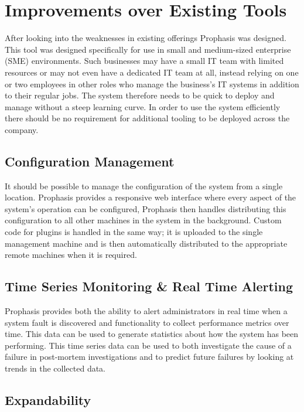 \documentclass[bsc,deptreport,twoside,parskip,singlespacing,notimes]{infthesis}
\begin{document}

\section{Improvements over Existing Tools}
	After looking into the weaknesses in existing offerings	Prophasis was designed.
	This tool was designed specifically for use in small and medium-sized enterprise
	(SME) environments. Such businesses may have a small IT team with limited
	resources or may not
	even have a dedicated IT team at all, instead relying on one or two employees
	in other roles who manage the business's IT systems in addition to their
	regular jobs. The system therefore needs to be quick to deploy and manage without
	a steep learning curve. In order to use the system efficiently there should
	be no requirement for additional tooling to be deployed across the company.

\subsection{Configuration Management}

	It should be possible to manage the configuration of the system from a single
	location.  Prophasis provides a responsive web interface where every
	aspect of the system's operation can be configured, Prophasis then handles
	distributing this configuration to all other machines in the system in the
	background. Custom code for plugins is handled in the same way; it is uploaded
	to the single management machine and is then automatically distributed to the
	appropriate remote machines when it is required.

\subsection{Time Series Monitoring \& Real Time Alerting}

	Prophasis provides both the ability to alert administrators in real time when a
	system fault is discovered and functionality to collect
	performance metrics over time. This data can be used to generate statistics about
	how the system has been performing.  This time series data can be used to both
	investigate the cause of a failure in post-mortem investigations and to predict
	future failures by looking at trends in the	collected data.

\subsection{Expandability}
\end{document}
